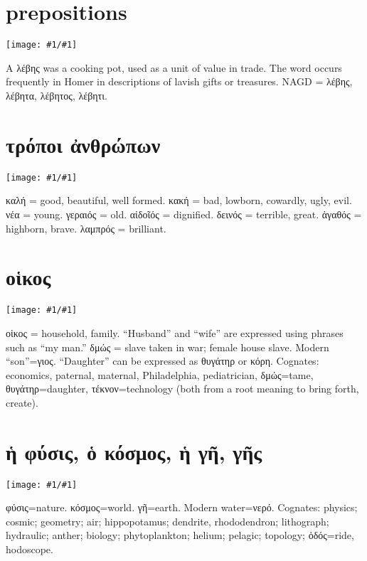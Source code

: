 \documentclass[12pt,openany]{book}
\newenvironment{notes}{\vfill\scriptsize\begin{flushright}}{\end{flushright}}
\newcommand{\fig}[1]{\begin{center}\texttt{[image: \#1/\#1]}\end{center}}
\begin{document}

\chapter{prepositions}

\fig{prepositions}

\begin{notes}
A λέβης was a cooking pot, used as a unit of value in trade. The word occurs frequently in Homer in descriptions
of lavish gifts or treasures. NAGD = λέβης, λέβητα, λέβητος, λέβητι.
\end{notes}


\chapter{τρόποι ἀνθρώπων}

\fig{character}

\begin{notes}
καλή = good, beautiful, well formed. κακή = bad, lowborn, cowardly, ugly, evil. νέα = young.
γεραιός = old. αἰδοῖός = dignified. δεινός = terrible, great. ἀγαθός = highborn, brave.
λαμπρός = brilliant.
\end{notes}

\chapter{οἱκος}

\fig{family}

\begin{notes}
οἱκος = household, family. ``Husband'' and ``wife'' are expressed using phrases such as ``my man.''
δμώς = slave taken in war; female house slave. Modern ``son''=γιος. ``Daughter'' can be expressed
as θυγάτηρ or κόρη.
Cognates: economics, paternal, maternal, Philadelphia, pediatrician, δμώς=tame, θυγάτηρ=daughter,
τέκνον=technology (both from a root meaning to bring forth, create).
\end{notes}


\chapter{ἡ φύσις, ὁ κόσμος, ἡ γῆ, γῆς}

\fig{world}

\begin{notes}
φύσις=nature. κόσμος=world. γῆ=earth.
Modern water=νερό. Cognates: physics; cosmic; geometry; air; hippopotamus; dendrite, rhododendron; lithograph;
hydraulic; anther; biology; phytoplankton; helium; pelagic; topology; ὁδός=ride, hodoscope.
\end{notes}
\end{document}
